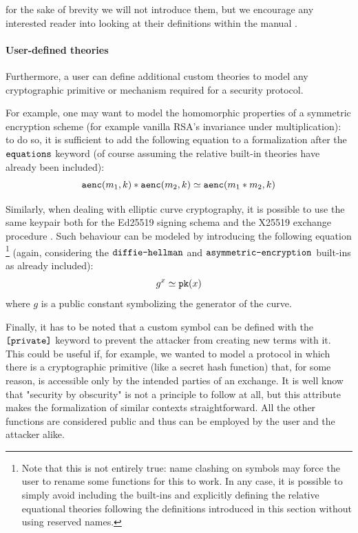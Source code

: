\documentclass{article}
\newcommand{\mono}[1]{\textrm{\tt #1}}
\newcounter{definition}[section]\setcounter{definition}{0}
\begin{document}
for the sake of brevity we will not introduce them, but we encourage any interested reader into looking at their definitions within the manual \cite{tamarinManual}.

\paragraph{User-defined theories}
Furthermore, a user can define additional custom theories to model any cryptographic primitive or mechanism required for a security protocol.

For example, one may want to model the homomorphic properties of a symmetric encryption scheme (for example vanilla RSA's invariance under multiplication): to do so, it is sufficient to add the following equation to a formalization after the $\mono{equations}$ keyword (of course assuming the relative built-in theories have already been included):
\begin{equation*}
    \mono{aenc}(m_1, k) * \mono{aenc}(m_2, k) \simeq \mono{aenc}(m_1*m_2, k)
\end{equation*}

Similarly, when dealing with elliptic curve cryptography, it is possible to use the same keypair both for the Ed25519 signing schema and the X25519 exchange procedure \cite{signdh}. Such behaviour can be modeled by introducing the following equation \footnote{Note that this is not entirely true: name clashing on symbols may force the user to rename some functions for this to work. In any case, it is possible to simply avoid including the built-ins and explicitly defining the relative equational theories following the definitions introduced in this section without using reserved names.} (again, considering the $\mono{diffie-hellman}$ and $\mono{asymmetric-encryption}$ built-ins as already included):
\begin{equation*}
    g^x \simeq \mono{pk}(x)
\end{equation*}
where $g$ is a public constant symbolizing the generator of the curve.

Finally, it has to be noted that a custom symbol can be defined with the $\mono{[private]}$ keyword to prevent the attacker from creating new terms with it. This could be useful if, for example, we wanted to model a protocol in which there is a cryptographic primitive (like a secret hash function) that, for some reason, is accessible only by the intended parties of an exchange. It is well know that "security by obscurity" is not a principle to follow at all, but this attribute makes the formalization of similar contexts straightforward. All the other functions are considered public and thus can be employed by the user and the attacker alike.
\end{document}

